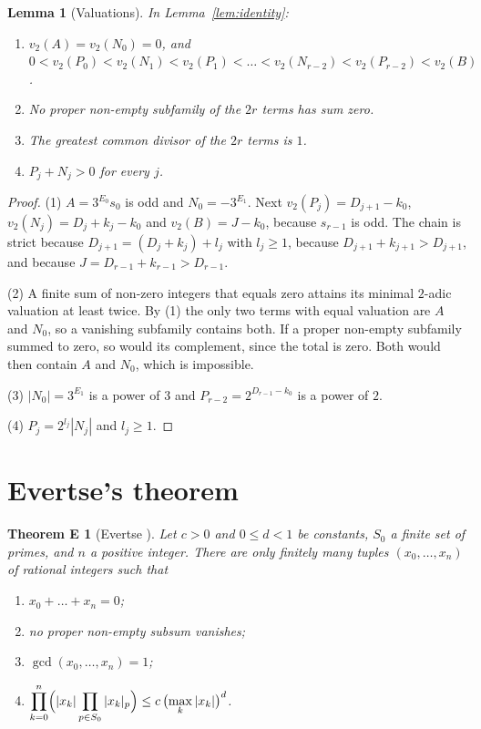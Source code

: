 \documentclass[11pt]{amsart}
\newtheorem{lemma}{Lemma}
\newtheorem*{theoremE}{Theorem E}
\theoremstyle{remark}
\newcommand{\vt}{v_2}
\begin{document}
\begin{lemma}[Valuations]\label{lem:val}
In Lemma~\ref{lem:identity}:
\begin{enumerate}
\item $\vt(A)=\vt(N_0)=0$, and
$0<\vt(P_0)<\vt(N_1)<\vt(P_1)<\dots<\vt(N_{r-2})<\vt(P_{r-2})<\vt(B)$.
\item No proper non-empty subfamily of the $2r$ terms has sum zero.
\item The greatest common divisor of the $2r$ terms is $1$.
\item $P_j+N_j>0$ for every $j$.
\end{enumerate}
\end{lemma}

\begin{proof}
(1) $A=3^{E_0}s_0$ is odd and $N_0=-3^{E_1}$. Next $\vt(P_j)=D_{j+1}-k_0$,
$\vt(N_j)=D_j+k_j-k_0$ and $\vt(B)=J-k_0$, because $s_{r-1}$ is odd. The chain is strict
because $D_{j+1}=(D_j+k_j)+l_j$ with $l_j\ge 1$, because $D_{j+1}+k_{j+1}>D_{j+1}$, and
because $J=D_{r-1}+k_{r-1}>D_{r-1}$.

(2) A finite sum of non-zero integers that equals zero attains its minimal $2$-adic
valuation at least twice. By (1) the only two terms with equal valuation are $A$ and $N_0$,
so a vanishing subfamily contains both. If a proper non-empty subfamily summed to zero, so
would its complement, since the total is zero. Both would then contain $A$ and $N_0$, which
is impossible.

(3) $|N_0|=3^{E_1}$ is a power of $3$ and $P_{r-2}=2^{D_{r-1}-k_0}$ is a power of $2$.

(4) $P_j=2^{l_j}|N_j|$ and $l_j\ge 1$.
\end{proof}

\section{Evertse's theorem}

\begin{theoremE}[Evertse {\cite[Corollary 1]{Evertse}}]
Let $c>0$ and $0\le d<1$ be constants, $S_0$ a finite set of primes, and $n$ a positive
integer. There are only finitely many tuples $(x_0,\dots,x_n)$ of rational integers such
that
\begin{enumerate}
\item[(i)] $x_0+\dots+x_n=0$;
\item[(ii)] no proper non-empty subsum vanishes;
\item[(iii)] $\gcd(x_0,\dots,x_n)=1$;
\item[(iv)] $\displaystyle\prod_{k=0}^n\Bigl(|x_k|\prod_{p\in S_0}|x_k|_p\Bigr)\le
c\,\bigl(\max_k|x_k|\bigr)^d$.
\end{enumerate}
\end{theoremE}
\end{document}
